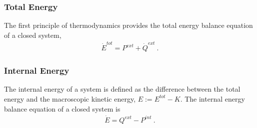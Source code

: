 \documentclass[letterpaper,10pt,english]{jupyterBook}
\begin{document}
\subsubsection{Total Energy}
\label{\detokenize{ch/circuits-electromechanic-old:total-energy}}
\sphinxAtStartPar
The first principle of thermodynamics provides the total energy balance equation of a closed system,
\begin{equation*}
\begin{split}\dot{E}^{tot} = P^{ext} + \dot{Q}^{ext} \ .\end{split}
\end{equation*}

\subsubsection{Internal Energy}
\label{\detokenize{ch/circuits-electromechanic-old:internal-energy}}
\sphinxAtStartPar
The internal energy of a system is defined as the difference between the total energy and the macroscopic kinetic energy, \(E := E^{tot} - K\). The internal energy balance equation of a closed system is
\begin{equation*}
\begin{split}\dot{E} = Q^{ext} - P^{int} \ .\end{split}
\end{equation*}
\end{document}
